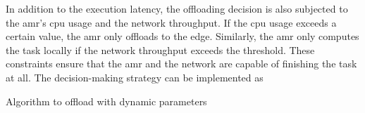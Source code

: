 In addition to the execution latency, the offloading decision is also subjected to the \gls{amr}'s \gls{cpu} usage and the network throughput. If the \gls{cpu} usage exceeds a certain value, the \gls{amr} only offloads to the edge. Similarly, the \gls{amr} only computes the task locally if the network throughput exceeds the threshold. These constraints ensure that the \gls{amr} and the network are capable of finishing the task at all. The decision-making strategy can be implemented as 

\begin{algorithm}[htp]
\caption{Algorithm to offload with dynamic parameters}\label{alg:decision_making_strategy}
\begin{algorithmic}[1]
    \EndFunction
\end{algorithmic}
\end{algorithm}
